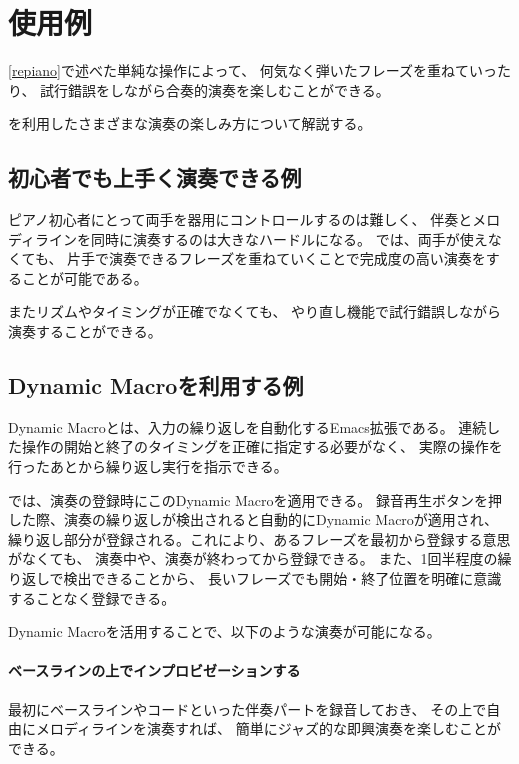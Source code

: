 \section{{\system}使用例}

\ref{repiano}で述べた単純な操作によって、
何気なく弾いたフレーズを重ねていったり、
試行錯誤をしながら合奏的演奏を楽しむことができる。

{\system}を利用したさまざまな演奏の楽しみ方について解説する。

\subsection{初心者でも上手く演奏できる例}
ピアノ初心者にとって両手を器用にコントロールするのは難しく、
伴奏とメロディラインを同時に演奏するのは大きなハードルになる。
{\system}では、両手が使えなくても、
片手で演奏できるフレーズを重ねていくことで完成度の高い演奏をすることが可能である。

またリズムやタイミングが正確でなくても、
やり直し機能で試行錯誤しながら演奏することができる。


\subsection{Dynamic Macroを利用する例}
Dynamic Macroとは、入力の繰り返しを自動化するEmacs拡張である。
連続した操作の開始と終了のタイミングを正確に指定する必要がなく、
実際の操作を行ったあとから繰り返し実行を指示できる。

{\system}では、演奏の登録時にこのDynamic Macroを適用できる。
録音再生ボタンを押した際、演奏の繰り返しが検出されると自動的にDynamic Macroが適用され、
繰り返し部分が登録される。これにより、あるフレーズを最初から登録する意思がなくても、
演奏中や、演奏が終わってから登録できる。
また、1回半程度の繰り返しで検出できることから、
長いフレーズでも開始・終了位置を明確に意識することなく登録できる。

Dynamic Macroを活用することで、以下のような演奏が可能になる。

\paragraph*{ベースラインの上でインプロビゼーションする}
最初にベースラインやコードといった伴奏パートを録音しておき、
その上で自由にメロディラインを演奏すれば、
簡単にジャズ的な即興演奏を楽しむことができる。


